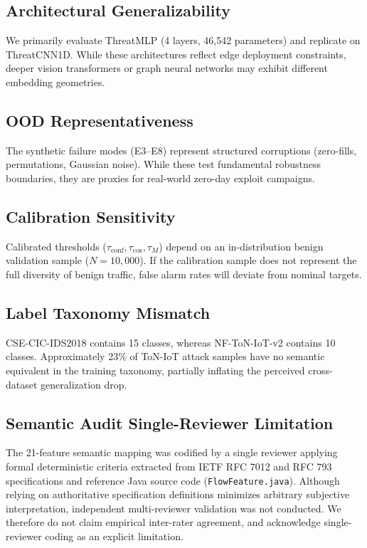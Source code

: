 \documentclass[journal]{IEEEtran}
\begin{document}
\subsection{Architectural Generalizability}
We primarily evaluate ThreatMLP (4 layers, 46,542 parameters) and replicate on ThreatCNN1D. While these architectures reflect edge deployment constraints, deeper vision transformers or graph neural networks may exhibit different embedding geometries.

\subsection{OOD Representativeness}
The synthetic failure modes (E3--E8) represent structured corruptions (zero-fills, permutations, Gaussian noise). While these test fundamental robustness boundaries, they are proxies for real-world zero-day exploit campaigns.

\subsection{Calibration Sensitivity}
Calibrated thresholds ($\tau_{\text{conf}}, \tau_{\cos}, \tau_M$) depend on an in-distribution benign validation sample ($N=10{,}000$). If the calibration sample does not represent the full diversity of benign traffic, false alarm rates will deviate from nominal targets.

\subsection{Label Taxonomy Mismatch}
CSE-CIC-IDS2018 contains 15 classes, whereas NF-ToN-IoT-v2 contains 10 classes. Approximately 23\% of ToN-IoT attack samples have no semantic equivalent in the training taxonomy, partially inflating the perceived cross-dataset generalization drop.

\subsection{Semantic Audit Single-Reviewer Limitation}
\label{sec:threats_audit}
The 21-feature semantic mapping was codified by a single reviewer applying formal deterministic criteria extracted from IETF RFC 7012 and RFC 793 specifications and reference Java source code (\texttt{FlowFeature.java}). Although relying on authoritative specification definitions minimizes arbitrary subjective interpretation, independent multi-reviewer validation was not conducted. We therefore do not claim empirical inter-rater agreement, and acknowledge single-reviewer coding as an explicit limitation.
\end{document}
